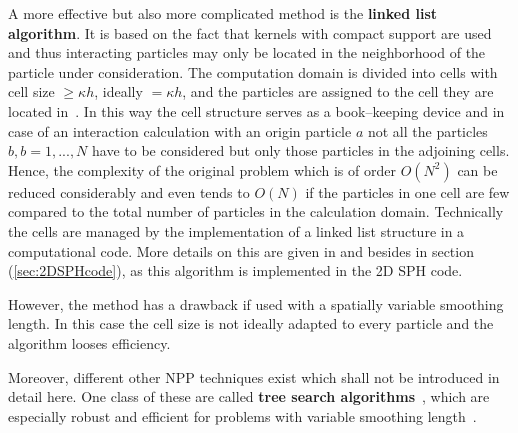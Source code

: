 \documentclass[11pt,a4paper,twoside]{report}
\begin{document}
A more effective but also more complicated method is the {\bf linked list
algorithm}. It is based on the fact that kernels with compact support are
used and thus interacting particles may only be located in the neighborhood of
the particle under consideration. The computation domain is divided into cells with
cell size $\ge \kappa h$, ideally $=\kappa h$, and the
particles are assigned to the cell they are located in~\cite{Monaghan1983}. In this way the cell
structure serves as a book--keeping device and in case of an interaction
calculation with an origin particle $a$ not all the particles $b,b={1,...,N}$ have to be considered but only those particles in the adjoining cells. Hence, the
complexity of the original problem which is of order $O(N^2)$ can be reduced
considerably and even tends to $O(N)$ if the particles in one cell are few compared to the total number of particles in the calculation domain. 
Technically the cells are managed by the implementation of a linked list structure in a computational code. More details on this are given in \cite{Monaghan1985, Hockney1988} and besides in section (\ref{sec:2DSPHcode}), as this algorithm is implemented in the 2D SPH code.

However, the method has a drawback if used with a spatially variable smoothing length. In this case the cell size is not ideally adapted to every particle and the algorithm looses efficiency.

Moreover, different other NPP techniques exist which shall not be introduced in detail here. One class of these are called {\bf tree search algorithms}~\cite{Hernquist1989}, which are especially robust and efficient for problems with variable smoothing
length~\cite{Liu2003}.
\end{document}
